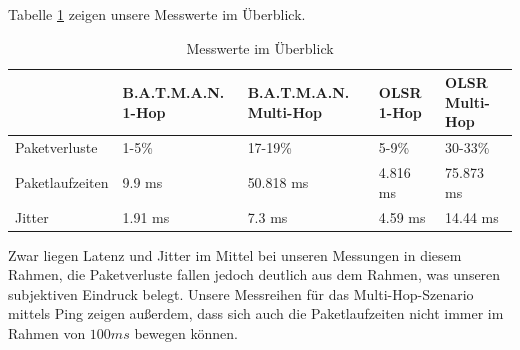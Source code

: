 \documentclass[a4paper,10pt]{article}
\begin{document}
Tabelle \ref{measures} zeigen unsere Messwerte im Überblick.

\begin{table}[htb]
\begin{tabular}{|l||l|l|l|l|}
\hline
& B.A.T.M.A.N. 1-Hop & B.A.T.M.A.N. Multi-Hop & OLSR 1-Hop & OLSR Multi-Hop \\
\hline
\hline
Paketverluste & 1-5\% & 17-19\% & 5-9\% & 30-33\% \\ 
\hline
Paketlaufzeiten & 9.9 ms & 50.818 ms & 4.816 ms & 75.873 ms \\
\hline
Jitter & 1.91 ms & 7.3 ms & 4.59 ms & 14.44 ms \\ 
\hline
\end{tabular}
\caption{Messwerte im Überblick}
\label{measures}
\end{table}

Zwar liegen Latenz und Jitter im Mittel bei unseren Messungen in diesem Rahmen, 
die Paketverluste fallen jedoch deutlich aus dem Rahmen, 
was unseren subjektiven Eindruck belegt.
Unsere Messreihen für das Multi-Hop-Szenario mittels Ping zeigen außerdem, 
dass sich auch die Paketlaufzeiten nicht immer im Rahmen von $100ms$ bewegen können. 
\end{document}
